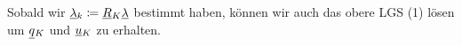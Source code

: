 Sobald wir $ \underline{\lambda}{}_k \coloneqq \underline{R}{}_K \underline{\lambda}{}$ bestimmt haben, können wir auch das obere LGS (1) lösen um $ \underline{q}{}_K $ und $ \underline{u}{}_K $ zu erhalten.



